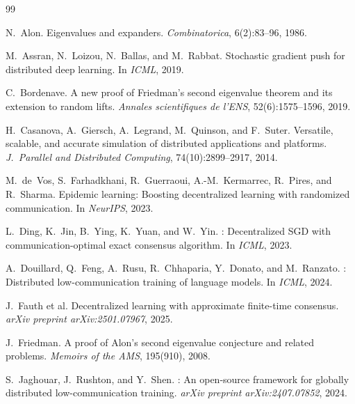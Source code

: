 \documentclass{article}
\begin{document}
\begin{thebibliography}{99}
\small


N.~Alon.
\newblock Eigenvalues and expanders.
\newblock \emph{Combinatorica}, 6(2):83--96, 1986.

M.~Assran, N.~Loizou, N.~Ballas, and M.~Rabbat.
\newblock Stochastic gradient push for distributed deep learning.
\newblock In \emph{ICML}, 2019.

C.~Bordenave.
\newblock A new proof of Friedman's second eigenvalue theorem and its extension to random lifts.
\newblock \emph{Annales scientifiques de l'ENS}, 52(6):1575--1596, 2019.

H.~Casanova, A.~Giersch, A.~Legrand, M.~Quinson, and F.~Suter.
\newblock Versatile, scalable, and accurate simulation of distributed applications and platforms.
\newblock \emph{J.\ Parallel and Distributed Computing}, 74(10):2899--2917, 2014.

M.~de~Vos, S.~Farhadkhani, R.~Guerraoui, A.-M.~Kermarrec, R.~Pires, and R.~Sharma.
\newblock Epidemic learning: Boosting decentralized learning with randomized communication.
\newblock In \emph{NeurIPS}, 2023.

L.~Ding, K.~Jin, B.~Ying, K.~Yuan, and W.~Yin.
: Decentralized {SGD} with communication-optimal exact consensus algorithm.
\newblock In \emph{ICML}, 2023.

A.~Douillard, Q.~Feng, A.~Rusu, R.~Chhaparia, Y.~Donato, and M.~Ranzato.
: Distributed low-communication training of language models.
\newblock In \emph{ICML}, 2024.

J.~Fauth et al.
\newblock Decentralized learning with approximate finite-time consensus.
\newblock \emph{arXiv preprint arXiv:2501.07967}, 2025.

J.~Friedman.
\newblock A proof of {A}lon's second eigenvalue conjecture and related problems.
\newblock \emph{Memoirs of the AMS}, 195(910), 2008.

S.~Jaghouar, J.~Rushton, and Y.~Shen.
: An open-source framework for globally distributed low-communication training.
\newblock \emph{arXiv preprint arXiv:2407.07852}, 2024.


\end{thebibliography}
\end{document}
